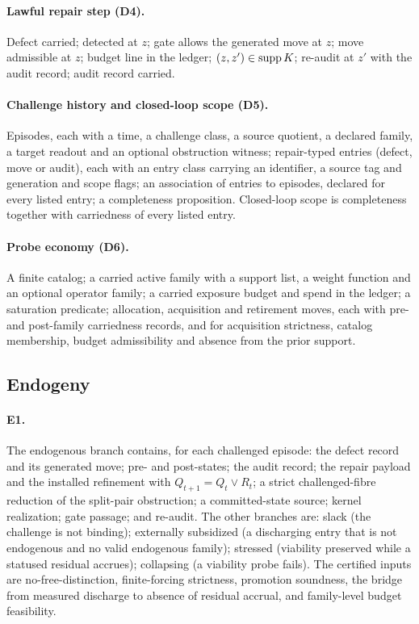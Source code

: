 \paragraph{Lawful repair step (D4).} Defect carried; detected at $z$; gate allows the generated move
at $z$; move admissible at $z$; budget line in the ledger; $(z, z') \in \operatorname{supp} K$; re-audit at $z'$
with the audit record; audit record carried.

\paragraph{Challenge history and closed-loop scope (D5).} Episodes, each with a time, a challenge
class, a source quotient, a declared family, a target readout and an optional obstruction witness;
repair-typed entries (defect, move or audit), each with an entry class carrying an identifier, a
source tag and generation and scope flags; an association of entries to episodes, declared for every
listed entry; a completeness proposition. Closed-loop scope is completeness together with
carriedness of every listed entry.

\paragraph{Probe economy (D6).} A finite catalog; a carried active family with a support list, a
weight function and an optional operator family; a carried exposure budget and spend in the ledger;
a saturation predicate; allocation, acquisition and retirement moves, each with pre- and post-family
carriedness records, and for acquisition strictness, catalog membership, budget admissibility and
absence from the prior support.

\subsection{Endogeny}

\paragraph{E1.} The endogenous branch contains, for each challenged episode: the defect record and
its generated move; pre- and post-states; the audit record; the repair payload and the installed
refinement with $Q_{t+1} = Q_t \vee R_t$; a strict challenged-fibre reduction of the split-pair
obstruction; a committed-state source; kernel realization; gate passage; and re-audit. The other
branches are: slack (the challenge is not binding); externally subsidized (a discharging entry
that is not endogenous and no valid endogenous family); stressed (viability preserved while a
statused residual accrues); collapsing (a viability probe fails). The certified inputs are
no-free-distinction, finite-forcing strictness, promotion soundness, the bridge from measured
discharge to absence of residual accrual, and family-level budget feasibility.

